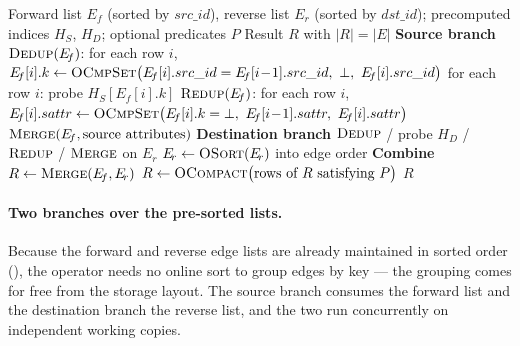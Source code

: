 \begin{algorithm}[t]
\caption{Oblivious \onehop Operator}
\label{alg:onehop}
\begin{algorithmic}[1]
\Require Forward list $E_{\!f}$ (sorted by $src\_id$), reverse list $E_{\!r}$
         (sorted by $dst\_id$); precomputed indices $H_S$, $H_D$; optional
         predicates $P$
\Ensure  Result $R$ with $|R| = |E|$
\Statex
\State \textbf{Source branch} 
\State $\textsc{Dedup}(E_{\!f})$: for each row $i$,
       $E_{\!f}[i].k \gets \textsc{OCmpSet}\big(E_{\!f}[i].src\_id = E_{\!f}[i\!-\!1].src\_id,\ \bot,\ E_{\!f}[i].src\_id\big)$
\State for each row $i$: probe $H_S[E_{\!f}[i].k]$ 
\State $\textsc{Redup}(E_{\!f})$: for each row $i$,
       $E_{\!f}[i].sattr \gets \textsc{OCmpSet}\big(E_{\!f}[i].k = \bot,\ E_{\!f}[i\!-\!1].sattr,\ E_{\!f}[i].sattr\big)$
\State $\textsc{Merge}(E_{\!f}, \text{source attributes})$ 
\Statex
\State \textbf{Destination branch} 
\State $\textsc{Dedup}$ / probe $H_D$ / $\textsc{Redup}$ / $\textsc{Merge}$ on $E_{\!r}$
\State $E_{\!r} \gets \textsc{OSort}(E_{\!r})$ into edge order 
\Statex
\State \textbf{Combine}
\State $R \gets \textsc{Merge}(E_{\!f}, E_{\!r})$ 
 
    \State $R \gets \textsc{OCompact}\big(\text{rows of } R \text{ satisfying } P\big)$
\EndIf
\State \Return $R$
\end{algorithmic}
\end{algorithm}

\paragraph{Two branches over the pre-sorted lists.}
Because the forward and reverse edge lists are already maintained in sorted order
(), the operator needs no online sort to group edges by
key --- the grouping comes for free from the storage layout. The source branch
consumes the forward list and the destination branch the reverse list, and the
two run concurrently on independent working copies.


